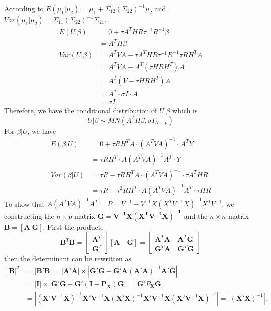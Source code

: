 \documentclass[12pt]{article}
\begin{document}
    According to $E(\mu_1|\mu_2)=\mu_1+\Sigma_{12}(\Sigma_{22})^{-1}\mu_2$ and $Var(\mu_1|\mu_2)=\Sigma_{11}(\Sigma_{22})^{-1}\Sigma_{21}$.\\
    \begin{align*}
        E(U|\beta)&=0+\tau A^THR\tau^{-1}R^{-1}\beta\\
        &=A^TH\beta\\
        Var(U|\beta)&=A^TVA-\tau A^THR\tau^{-1}R^{-1}\tau RH^TA\\
        &=A^TVA-A^T(\tau HRH^T)A\\
        &=A^T(V-\tau HRH^T)A\\
        &=A^T\cdot \sigma I\cdot A\\
        &=\sigma I
    \end{align*}
    Therefore, we have the conditional distribution of $U|\beta$ which is
    \begin{equation*}
    U|\beta\sim MN(A^TH\beta,\sigma I_{N-p})
    \end{equation*}
    For $\beta|U$, we have
    \begin{align*}
        E(\beta|U)&=0+\tau RH^TA\cdot(A^TVA)^{-1}\cdot A^TY\\
        &=\tau RH^T\cdot A(A^TVA)^{-1}A^T\cdot Y\\
        Var(\beta|U)&=\tau R-\tau RH^TA\cdot(A^TVA)^{-1}\cdot \tau A^THR\\
        &=\tau R-\tau^2 RH^T\cdot A(A^TVA)^{-1}A^T\cdot \tau HR
    \end{align*}
    To show that $A(A^TVA)^{-1}A^T=P=V^{-1}-V^{-1}X(X^TV^{-1}X)^{-1}X^TV^{-1}$, we constructing the $n\times p$ matrix $\mathbf{G=V^{-1}X(X^TV^{-1}X)^{-1}}$ and the $n\times n$ matrix $\mathbf{B=[A|G]}$. First the product,
    \begin{equation*}
    \textbf{B}^T\textbf{B}=\begin{bmatrix}
        \textbf{A}^T\\
        \textbf{G}^T
        \end{bmatrix}
        [\mathbf{A}\quad \mathbf{G}]=\begin{bmatrix}
        \mathbf{A}^T\mathbf{A} \quad \mathbf{A}^T\mathbf{G}\\
        \mathbf{G}^T\mathbf{A} \quad \mathbf{G}^T\mathbf{G}
        \end{bmatrix}
    \end{equation*}
    then the determinant can be rewritten as
    \begin{equation*}
    \begin{split}
    |\textbf{B}|^2&=|\textbf{B}'\textbf{B}|=|\mathbf{A}'\mathbf{A}|\times|\mathbf{G}'\mathbf{G}-\mathbf{G}'\mathbf{A}(\mathbf{A}'\mathbf{A})^{-1}\mathbf{A}'\mathbf{G}|\\
    &=|\textbf{I}|\times|\mathbf{G}'\mathbf{G}-\mathbf{G}'(\mathbf{I-P_X})\mathbf{G}|=|\mathbf{G}'P_\mathbf{X}\mathbf{G}|\\
    &=|(\mathbf{X}'\mathbf{V}^{-1}\mathbf{X})^{-1}\mathbf{X}'\mathbf{V}^{-1}\mathbf{X}(\mathbf{X}'\mathbf{X})^{-1}\mathbf{X}'\mathbf{V}^{-1}\mathbf{X}(\mathbf{X}'\mathbf{V}^{-1}\mathbf{X})^{-1}|=|(\mathbf{X}'\mathbf{X})^{-1}|.
    \end{split}
    \end{equation*}
\end{document}
